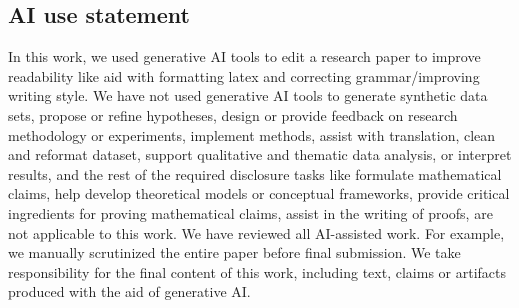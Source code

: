 \documentclass{article} %
\begin{document}

\subsection*{AI use statement}
In this work, we used generative AI tools to edit a research paper to improve readability like aid with formatting latex and correcting grammar/improving writing style.
We have not used generative AI tools to generate synthetic data sets, propose or refine hypotheses, design or provide feedback on research  methodology or experiments, implement methods, assist with translation, clean and reformat dataset, support qualitative and thematic data analysis, or interpret results,
and the rest of the required disclosure tasks like formulate mathematical claims, help develop theoretical models or conceptual frameworks, provide critical ingredients for proving mathematical claims, assist in the writing of proofs, are not applicable to this work. We have reviewed all AI-assisted work. For example, we manually scrutinized the entire paper before final submission. We take responsibility for the final content of this work,
including text, claims or artifacts produced with the aid of generative AI.



\end{document}
